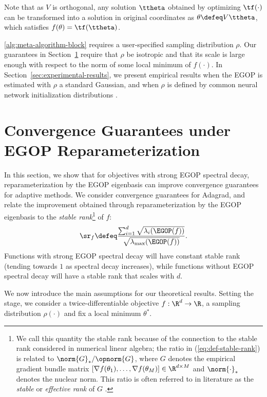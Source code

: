 \documentclass{article}
\begin{document}
    Note that as $V$ is orthogonal, any solution $\ttheta$ obtained by optimizing $\tf(\cdot)$ can be transformed into a solution in original coordinates as $\theta \defeq
    V \ttheta$, which satisfies $f(\theta) = \tf(\ttheta)$.

    \cref{alg:meta-algorithm-block} requires a user-specified sampling distribution $\rho$. Our guarantees in  Section~\ref{sec:convergence-analysis} require that $\rho$ be isotropic and that its scale is large enough with respect to the norm of some local minimum of $f(\cdot)$. In Section~\ref{sec:experimental-results}, we present empirical results when the EGOP is estimated with $\rho$ a standard Gaussian, and when $\rho$ is defined by common neural network initialization distributions \cite{glorot2010understanding}.
    
\section{Convergence Guarantees under EGOP Reparameterization}\label{sec:convergence-analysis}

In this section, we show that for objectives with strong EGOP spectral decay, reparameterization by the EGOP eigenbasis can improve convergence guarantees for adaptive methods. We consider convergence guarantees for Adagrad, and relate the improvement obtained through reparameterization by the EGOP eigenbasis to the \textit{stable rank}\footnote{We call this quantity the stable rank because of the connection to the stable rank considered in numerical linear algebra; the ratio in (\ref{eq:def-stable-rank}) is related to $\norm{G}_*/\opnorm{G}$, where $G$ denotes the empirical gradient bundle matrix $[\nabla f(\theta_1),\dots,\nabla f(\theta_M)]\in \R^{d\times M}$ and $\norm{\cdot}_*$ denotes the nuclear norm. This ratio is often referred to in literature as the \textit{stable} or \textit{effective rank} of $G$ \cite{chou2024gradient,rudelson2007sampling}.} of $f$:
\begin{equation}\label{eq:def-stable-rank}
    {\sr}_f \defeq \frac{\sum_{i=1}^d \sqrt{\lambda_i(\EGOP(f))}}{\sqrt{\lambda_{\max}(\EGOP(f))}}.
\end{equation}
Functions with strong EGOP spectral decay will have constant stable rank (tending towards $1$ as spectral decay increases), while functions without EGOP spectral decay will have a stable rank that scales with $d$.

We now introduce the main assumptions for our theoretical results. Setting the stage,
we consider a twice-differentiable objective $f:\R^d\rightarrow \R$, a sampling distribution $\rho(\cdot)$ and fix a local minimum $\theta^*$.
\end{document}
